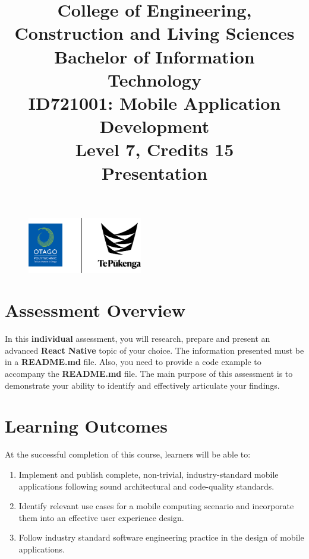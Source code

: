 \documentclass{article}
\author{}
\begin{document}
\begin{figure}
	\centering
	\includegraphics[width=50mm]{"../../../resources (ignore)/img/logo.png"}
\end{figure} 

\title{College of Engineering, Construction and Living Sciences\\Bachelor of Information Technology\\ID721001: Mobile Application Development\\Level 7, Credits 15\\\textbf{Presentation}}
\date{}
\maketitle

\section*{Assessment Overview}
In this \textbf{individual} assessment, you will research, prepare and present an advanced \textbf{React Native} topic of your choice. The information presented must be in a \textbf{README.md} file. Also, you need to provide a code example to accompany the \textbf{README.md} file. The main purpose of this assessment is to demonstrate your ability to identify and effectively articulate your findings.

\section*{Learning Outcomes}
At the successful completion of this course, learners will be able to:
\begin{enumerate}
	\item Implement and publish complete, non-trivial, industry-standard mobile applications following sound architectural and code-quality standards.
	\item Identify relevant use cases for a mobile computing scenario and incorporate them into an effective user experience design.
	\item Follow industry standard software engineering practice in the design of mobile applications.
\end{enumerate}
\end{document}
